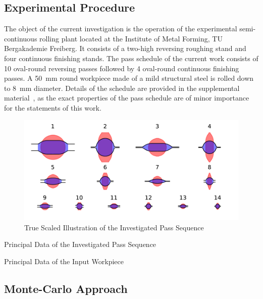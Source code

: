 \subsection{Experimental Procedure}\label{subsec:experimental-procedure}


The object of the current investigation is the operation of the experimental semi-continuous rolling plant located at the Institute of Metal Forming, TU Bergakademie Freiberg.
It consists of a two-high reversing roughing stand and four continuous finishing stands.
The pass schedule of the current work consists of 10 oval-round reversing passes followed by 4 oval-round continuous finishing passes.
A \qty{50}{\milli\meter} round workpiece made of a mild structural steel is rolled down to \qty{8}{\milli\meter} diameter.
Details of the schedule are provided in the supplemental material~\cite{esaform2023_weiner_supp}, as the exact properties of the pass schedule are of minor importance for the statements of this work.

\begin{figure}
    \centering
    \includegraphics{img/plot_pass_sequence}
    \caption{True Scaled Illustration of the Investigated Pass Sequence}
    \label{fig:plot_pass_sequence}
\end{figure}


\begin{table}
    \centering
    \caption{Principal Data of the Investigated Pass Sequence}
    \label{tab:process_conditions}
    
\end{table}



\begin{table}
    \centering
    \caption{Principal Data of the Input Workpiece}
    \label{tab:in_profile}
    
\end{table}


\subsection{Monte-Carlo Approach}\label{subsec:monte-carlo-approach}


